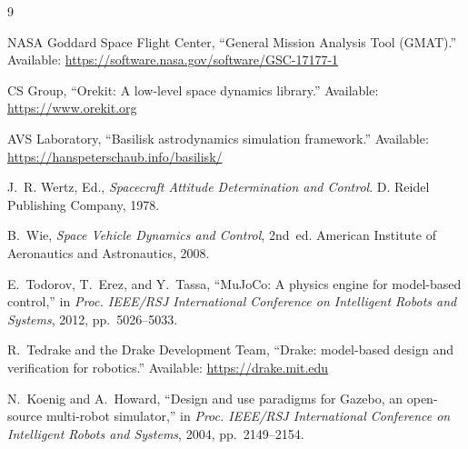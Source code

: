 \begin{thebibliography}{9}

NASA Goddard Space Flight Center,
``General Mission Analysis Tool (GMAT).''
Available: \url{https://software.nasa.gov/software/GSC-17177-1}

CS Group,
``Orekit: A low-level space dynamics library.''
Available: \url{https://www.orekit.org}

AVS Laboratory,
``Basilisk astrodynamics simulation framework.''
Available: \url{https://hanspeterschaub.info/basilisk/}

J.~R. Wertz, Ed.,
\emph{Spacecraft Attitude Determination and Control}.
D. Reidel Publishing Company, 1978.

B.~Wie,
\emph{Space Vehicle Dynamics and Control}, 2nd~ed.
American Institute of Aeronautics and Astronautics, 2008.

E.~Todorov, T.~Erez, and Y.~Tassa,
``MuJoCo: A physics engine for model-based control,''
in \emph{Proc. IEEE/RSJ International Conference on Intelligent Robots and Systems},
2012, pp.~5026--5033.

R.~Tedrake and the Drake Development Team,
``Drake: model-based design and verification for robotics.''
Available: \url{https://drake.mit.edu}

N.~Koenig and A.~Howard,
``Design and use paradigms for Gazebo, an open-source multi-robot simulator,''
in \emph{Proc. IEEE/RSJ International Conference on Intelligent Robots and Systems},
2004, pp.~2149--2154.

\end{thebibliography}
